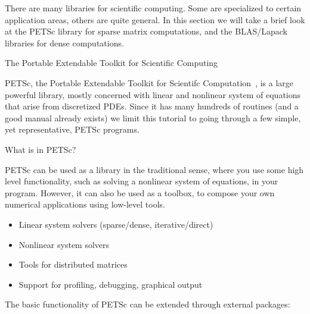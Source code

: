 

There are many libraries for scientific computing. Some are
specialized to certain application areas, others are quite general. In
this section we will take a brief look at the PETSc library for sparse
matrix computations, and the BLAS/Lapack libraries for dense
computations.

 {The Portable Extendable Toolkit for Scientific Computing}

PETSc, the Portable Extendable Toolkit for Scientifc
Computation~\cite{}, is a large powerful library, mostly concerned
with linear and nonlinear system of equations that arise from
discretized \acp{PDE}. Since it has many hundreds of routines (and a
good manual already exists) we limit this tutorial to going through
a few simple, yet representative, PETSc programs.

 {What is in PETSc?}

PETSc can be used as a library in the traditional sense, where you use
some high level functionality, such as solving a nonlinear system of
equations, in your program. However, it can also be used as a toolbox,
to compose your own numerical applications using low-level tools.

  \begin{itemize}
  \item Linear system solvers (sparse/dense, iterative/direct)
  \item Nonlinear system solvers
  \item Tools for distributed matrices
  \item Support for profiling, debugging, graphical output
  \end{itemize}

The basic functionality of PETSc can be extended through external
packages:

